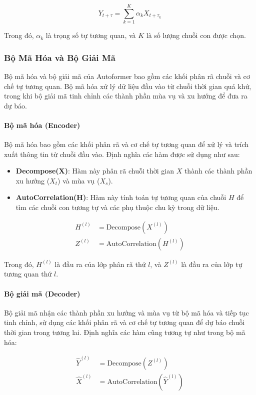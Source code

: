 \[
Y_{t+\tau} = \sum_{k=1}^{K} \alpha_k X_{t+\tau_k}
\]

Trong đó, \(\alpha_k\) là trọng số tự tương quan, và \(K\) là số lượng chuỗi con được chọn.

\subsubsection{Bộ Mã Hóa và Bộ Giải Mã}

Bộ mã hóa và bộ giải mã của Autoformer bao gồm các khối phân rã chuỗi và cơ chế tự tương quan. Bộ mã hóa xử lý dữ liệu đầu vào từ chuỗi thời gian quá khứ, trong khi bộ giải mã tinh chỉnh các thành phần mùa vụ và xu hướng để đưa ra dự báo.

\paragraph{Bộ mã hóa (Encoder)}

Bộ mã hóa bao gồm các khối phân rã và cơ chế tự tương quan để xử lý và trích xuất thông tin từ chuỗi đầu vào. Định nghĩa các hàm được sử dụng như sau:

\begin{itemize}
    \item \textbf{Decompose(X)}: Hàm này phân rã chuỗi thời gian \(X\) thành các thành phần xu hướng (\(X_t\)) và mùa vụ (\(X_s\)).
    \item \textbf{AutoCorrelation(H)}: Hàm này tính toán tự tương quan của chuỗi \(H\) để tìm các chuỗi con tương tự và các phụ thuộc chu kỳ trong dữ liệu.
\end{itemize}

\[
\begin{aligned}
    H^{(l)} &= \text{Decompose}(X^{(l)}) \\
    Z^{(l)} &= \text{AutoCorrelation}(H^{(l)})
\end{aligned}
\]

    
Trong đó, \(H^{(l)}\) là đầu ra của lớp phân rã thứ \(l\), và \(Z^{(l)}\) là đầu ra của lớp tự tương quan thứ \(l\).
    
\paragraph{Bộ giải mã (Decoder)}
    
Bộ giải mã nhận các thành phần xu hướng và mùa vụ từ bộ mã hóa và tiếp tục tinh chỉnh, sử dụng các khối phân rã và cơ chế tự tương quan để dự báo chuỗi thời gian trong tương lai. Định nghĩa các hàm cũng tương tự như trong bộ mã hóa:

\[
\begin{aligned}
    \hat{Y}^{(l)} &= \text{Decompose}(Z^{(l)}) \\
    \hat{X}^{(l)} &= \text{AutoCorrelation}(\hat{Y}^{(l)})
\end{aligned}
\]